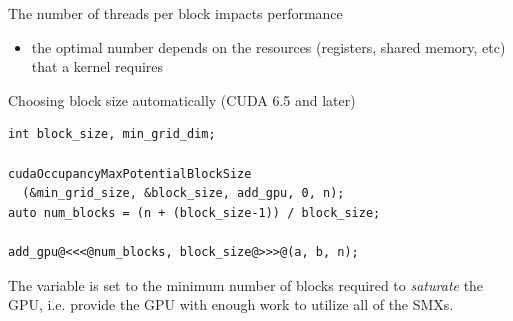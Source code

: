\begin{frame}[fragile]{}
    \begin{info}{The number of threads per block impacts performance}
    \begin{itemize}
        \item the optimal number depends on the resources (registers, shared memory, etc) that a kernel requires
    \end{itemize}
    \end{info}

    \begin{code}{Choosing block size automatically (CUDA 6.5 and later)}
        \begin{lstlisting}[style=boxcudatiny]
int block_size, min_grid_dim;

cudaOccupancyMaxPotentialBlockSize
  (&min_grid_size, &block_size, add_gpu, 0, n);
auto num_blocks = (n + (block_size-1)) / block_size;

add_gpu@<<<@num_blocks, block_size@>>>@(a, b, n);
        \end{lstlisting}
    \end{code}

    \begin{info}{}
    The variable  is set to the minimum number of blocks required to \emph{saturate} the GPU, i.e. provide the GPU with enough work to utilize all of the SMXs.
    \end{info}
\end{frame}


